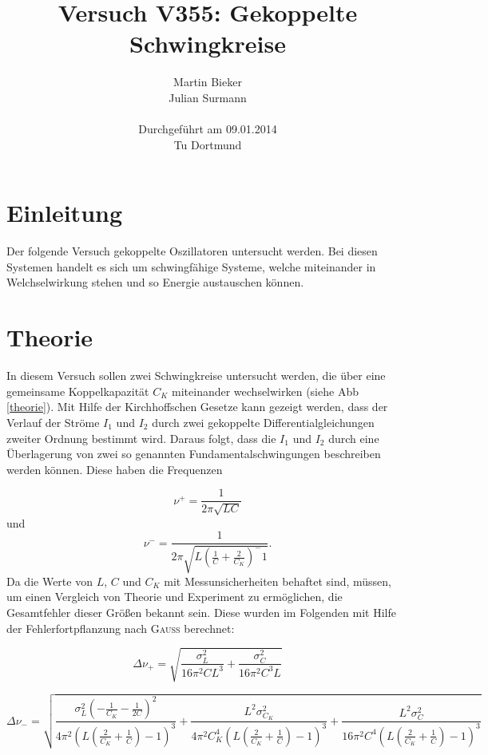 \documentclass[11pt,ngerman,a4paper]{article}
\title{\textbf{Versuch V355: Gekoppelte Schwingkreise}}
\author{Martin Bieker\\
		Julian Surmann\\
		\\
		Durchgef\"{u}hrt am 09.01.2014\\
		Tu Dortmund}
\date{}
\begin{document}
\renewcommand\tablename{Tabelle}
\renewcommand\figurename{Abbildung}
\maketitle
\thispagestyle{empty}
\newpage
\clearpage
\setcounter{page}{1}


\section{Einleitung}
Der folgende Versuch gekoppelte Oszillatoren untersucht werden. Bei diesen Systemen handelt es sich um schwingfähige Systeme, welche miteinander in Welchselwirkung stehen und so Energie austauschen können. 

\section{Theorie}

In diesem Versuch sollen zwei Schwingkreise untersucht werden, die über eine gemeinsame Koppelkapazität $C_K$ miteinander wechselwirken (siehe Abb \ref{theorie}). Mit Hilfe der Kirchhoffschen Gesetze kann gezeigt werden, dass der Verlauf der Ströme $I_1$ und $I_2$ durch zwei gekoppelte Differentialgleichungen zweiter Ordnung bestimmt wird. Daraus folgt, dass die $I_1$ und $I_2$ durch eine Überlagerung von zwei so genannten Fundamentalschwingungen beschreiben werden können. Diese haben die Frequenzen


\begin{equation}
\nu^+ = \frac{1}{2 \pi \sqrt{LC}}
\label{nueplus}
\end{equation}
und 
\begin{equation}
\nu^- =\frac1{2\pi\sqrt{L(\frac1C + \frac2{C_K})^-1}}.
\label{nueminus}
\end{equation}
Da die Werte von $L$, $C$ und $C_K$ mit Messunsicherheiten behaftet sind, müssen, um einen Vergleich von Theorie und Experiment zu ermöglichen, die Gesamtfehler dieser Größen bekannt sein. Diese wurden im Folgenden mit Hilfe der Fehlerfortpflanzung nach \textsc{Gauss} berechnet:

\begin{equation}
\Delta \nu_+ = \sqrt{\frac{\sigma_{L}^{2}}{16 \pi^{2} C L^{3}} + \frac{\sigma_{C}^{2}}{16 \pi^{2} C^{3} L}}
\end{equation}

\begin{equation}
\Delta \nu_- = \sqrt{\frac{\sigma_{L}^{2} \left(- \frac{1}{C_{K}} - \frac{1}{2 C}\right)^{2}}{4 \pi^{2} \left(L \left(\frac{2}{C_{K}} + \frac{1}{C}\right) - 1\right)^{3}} + \frac{L^{2} \sigma_{C_{K}}^{2}}{4 \pi^{2} C_{K}^{4} \left(L \left(\frac{2}{C_{K}} + \frac{1}{C}\right) - 1\right)^{3}} + \frac{L^{2} \sigma_{C}^{2}}{16 \pi^{2} C^{4} \left(L \left(\frac{2}{C_{K}} + \frac{1}{C}\right) - 1\right)^{3}}}
\end{equation}
\end{document}
